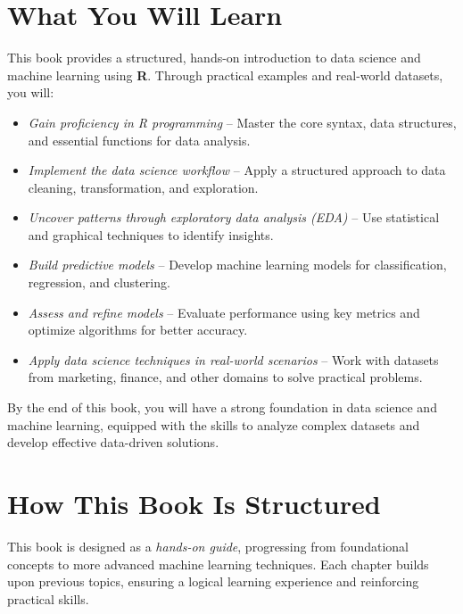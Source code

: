 \documentclass[
  11pt,
]{book}
\providecommand{\tightlist}{%
  \setlength{\itemsep}{0pt}\setlength{\parskip}{0pt}}
\theoremstyle{definition}
\theoremstyle{definition}
\theoremstyle{definition}
\theoremstyle{definition}
\theoremstyle{remark}
\begin{document}
\section*{What You Will Learn}\label{what-you-will-learn}


This book provides a structured, hands-on introduction to data science and machine learning using \textbf{R}. Through practical examples and real-world datasets, you will:

\begin{itemize}
\tightlist
\item
  \emph{Gain proficiency in R programming} -- Master the core syntax, data structures, and essential functions for data analysis.\\
\item
  \emph{Implement the data science workflow} -- Apply a structured approach to data cleaning, transformation, and exploration.\\
\item
  \emph{Uncover patterns through exploratory data analysis (EDA)} -- Use statistical and graphical techniques to identify insights.\\
\item
  \emph{Build predictive models} -- Develop machine learning models for classification, regression, and clustering.\\
\item
  \emph{Assess and refine models} -- Evaluate performance using key metrics and optimize algorithms for better accuracy.\\
\item
  \emph{Apply data science techniques in real-world scenarios} -- Work with datasets from marketing, finance, and other domains to solve practical problems.
\end{itemize}

By the end of this book, you will have a strong foundation in data science and machine learning, equipped with the skills to analyze complex datasets and develop effective data-driven solutions.

\section*{How This Book Is Structured}\label{how-this-book-is-structured}


This book is designed as a \emph{hands-on guide}, progressing from foundational concepts to more advanced machine learning techniques. Each chapter builds upon previous topics, ensuring a logical learning experience and reinforcing practical skills.
\end{document}
